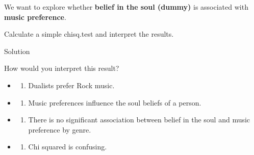 \documentclass[
]{book}
\newenvironment{Shaded}{\begin{snugshade}}{\end{snugshade}}
\newcommand{\CommentTok}[1]{\textcolor[rgb]{0.56,0.35,0.01}{\textit{#1}}}
\newcommand{\FunctionTok}[1]{\textcolor[rgb]{0.13,0.29,0.53}{\textbf{#1}}}
\newcommand{\NormalTok}[1]{#1}
\newcommand{\SpecialCharTok}[1]{\textcolor[rgb]{0.81,0.36,0.00}{\textbf{#1}}}
\providecommand{\tightlist}{%
  \setlength{\itemsep}{0pt}\setlength{\parskip}{0pt}}
\begin{document}
We want to explore whether \textbf{belief in the soul (dummy)} is associated with \textbf{music preference}.

Calculate a simple chisq.test and interpret the results.

Solution

\begin{Shaded}
\end{Shaded}

How would you interpret this result?

\begin{itemize}
\tightlist
\item
  \begin{enumerate}
  \def\labelenumi{(\Alph{enumi})}
  \tightlist
  \item
    Dualists prefer Rock music.\\
  \end{enumerate}
\item
  \begin{enumerate}
  \def\labelenumi{(\Alph{enumi})}
  \setcounter{enumi}{1}
  \tightlist
  \item
    Music preferences influence the soul beliefs of a person.\\
  \end{enumerate}
\item
  \begin{enumerate}
  \def\labelenumi{(\Alph{enumi})}
  \setcounter{enumi}{2}
  \tightlist
  \item
    There is no significant association between belief in the soul and music preference by genre.\\
  \end{enumerate}
\item
  \begin{enumerate}
  \def\labelenumi{(\Alph{enumi})}
  \setcounter{enumi}{3}
  \tightlist
  \item
    Chi squared is confusing.
  \end{enumerate}
\end{itemize}
\end{document}
